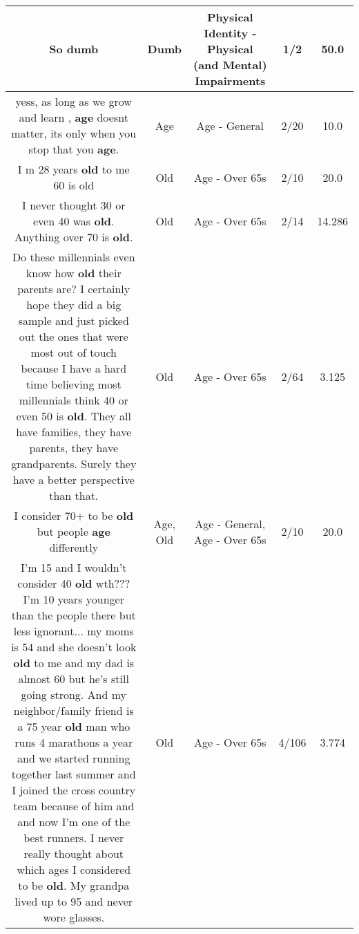 \documentclass[11pt]{article}
\newlength\mylength
\begin{document}
\begin{center}
\begin{longtable}{|C{.65\mylength}|C{.30\mylength}|C{.12\mylength}|C{.12\mylength}|C{.12\mylength}|}
  \small So dumb\normalsize   & Dumb & Physical Identity - Physical (and Mental) Impairments & 1/2 & 50.0 \\  \hline
  \small yess, as long as we grow and learn , \textbf{age} doesnt matter, its only when you stop that you \textbf{age}.\normalsize   & Age & Age - General & 2/20 & 10.0 \\  \hline
  \small I m 28 years \textbf{old} to me 60 is old\normalsize   & Old & Age - Over 65s & 2/10 & 20.0 \\  \hline
  \small I never thought 30 or even 40 was \textbf{old}. Anything over 70 is \textbf{old}.\normalsize   & Old & Age - Over 65s & 2/14 & 14.286 \\  \hline
  \small Do these millennials even know how \textbf{old} their parents are?  I certainly hope they did a big sample and just picked out the ones that were most out of touch because I have a hard time believing most millennials think 40 or even 50 is \textbf{old}.  They all have families, they have parents, they have grandparents.  Surely they have a better perspective than that.\normalsize   & Old & Age - Over 65s & 2/64 & 3.125 \\  \hline
  \small I consider 70+ to be \textbf{old} but people \textbf{age} differently\normalsize   & Age, Old & Age - General, Age - Over 65s & 2/10 & 20.0 \\  \hline
  \small I'm 15 and I wouldn't consider 40 \textbf{old} wth??? I'm  10 years younger than the people there but less ignorant... my moms is 54 and she doesn't look \textbf{old} to me and my dad is almost 60 but he's still going strong. And my neighbor/family friend is a 75 year \textbf{old} man who runs 4 marathons a year and we started running together last summer and I joined the cross country team because of him and and now I'm one of the best runners. I never really thought about which ages I considered to be \textbf{old}. My grandpa lived up to 95 and never wore glasses.\normalsize   & Old & Age - Over 65s & 4/106 & 3.774 \\  \hline

\end{longtable}
\end{center}
\end{document}
